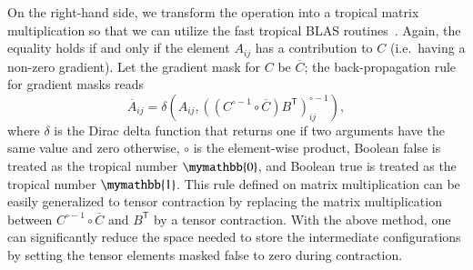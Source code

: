 \documentclass[onefignum, onetabnum]{siamart190516}
\newcommand{\<}{\langle}
\renewcommand{\>}{\rangle}
\begin{document}
On the right-hand side, we transform the operation into a tropical matrix multiplication so that we can utilize the fast tropical BLAS routines~\cite{TropicalGEMM}.
Again, the equality holds if and only if the element $A_{ij}$ has a contribution to $C$ (i.e.\ having a non-zero gradient).
Let the gradient mask for $C$ be $\overline C$; the back-propagation rule for gradient masks reads
\begin{equation}\label{eq:adrule}
\overline{A}_{ij} = \delta \left(A_{ij}, \left( \left( C^{\circ-1} \circ \overline C \right) B^{\mathsf{T}} \right)_{ij}^{\circ -1} \right),
\end{equation}
where $\delta$ is the Dirac delta function that returns one if two arguments have the same value and zero otherwise, $\circ$ is the element-wise product, Boolean false is treated as the tropical number $\mymathbb{0}$, and Boolean true is treated as the tropical number $\mymathbb{1}$.
This rule defined on matrix multiplication can be easily generalized to tensor contraction by replacing the matrix multiplication between $C^{\circ-1} \circ \overline C$ and $B^{\mathsf{T}}$ by a tensor contraction.
With the above method, one can significantly reduce the space needed to store the intermediate configurations by setting the tensor elements masked false to zero during contraction.
\end{document}
